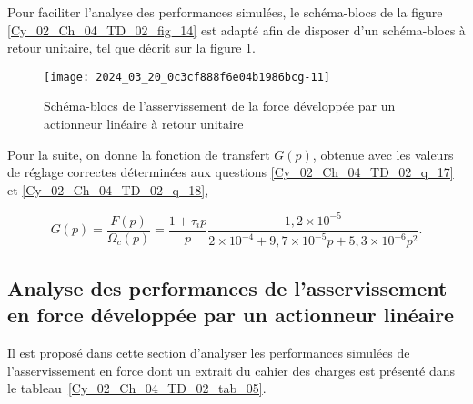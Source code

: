 Pour faciliter l'analyse des performances simulées, le schéma-blocs de la figure \ref{Cy_02_Ch_04_TD_02_fig_14} est adapté afin de disposer d'un schéma-blocs 
à retour unitaire, tel que décrit sur la figure \ref{Cy_02_Ch_04_TD_02_fig_15}.


\begin{figure}[!h]
\texttt{[image: 2024\_03\_20\_0c3cf888f6e04b1986bcg-11]}
\caption{Schéma-blocs de l'asservissement de la force développée par un actionneur linéaire à retour unitaire \label{Cy_02_Ch_04_TD_02_fig_15}}
\end{figure}


\ifprof
\begin{corrige}
\end{corrige}
\else
\fi

\ifprof
\begin{corrige}
\end{corrige}
\else
\fi

Pour la suite, on donne la fonction de transfert $G(p)$, obtenue avec les valeurs de réglage correctes déterminées aux questions \ref{Cy_02_Ch_04_TD_02_q_17} et \ref{Cy_02_Ch_04_TD_02_q_18},

$$
G(p)=\frac{F(p)}{\Omega_{c}(p)}=\frac{1+\tau_{i} p}{p} \frac{1,2 \times 10^{-5}}{2 \times 10^{-4}+9,7 \times 10^{-5} p+5,3 \times 10^{-6} p^{2}} .
$$

\subsection*{Analyse des performances de l'asservissement en force développée par un actionneur linéaire}

Il est proposé dans cette section d'analyser les performances simulées de l'asservissement en force dont un extrait du cahier des charges est présenté dans le tableau~\ref{Cy_02_Ch_04_TD_02_tab_05}.

